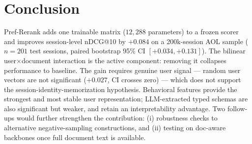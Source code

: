 \section{Conclusion}
\label{sec:conclusion}

Pref-Rerank adds one trainable matrix ($12{,}288$ parameters) to a frozen scorer and improves session-level nDCG@10 by $+0.084$ on a 200k-session AOL sample ($n{=}201$ test sessions, paired bootstrap 95\% CI $[+0.034, +0.131]$). The bilinear user$\times$document interaction is the active component: removing it collapses performance to baseline. The gain requires genuine user signal --- random user vectors are not significant ($+0.027$, CI crosses zero) --- which does not support the session-identity-memorization hypothesis. Behavioral features provide the strongest and most stable user representation; LLM-extracted typed schemas are also significant but weaker, and retain an interpretability advantage. Two follow-ups would further strengthen the contribution: (i) robustness checks to alternative negative-sampling constructions, and (ii) testing on doc-aware backbones once full document text is available.

